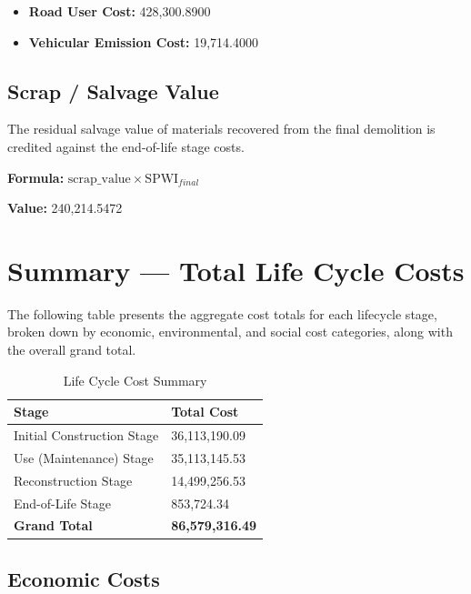 \documentclass[12pt,a4paper]{article}
\begin{document}
\begin{itemize}
  \item \textbf{Road User Cost:} 428,300.8900
  \item \textbf{Vehicular Emission Cost:} 19,714.4000
\end{itemize}

\subsection{Scrap / Salvage Value}

The residual salvage value of materials recovered from the final demolition is credited against the end-of-life stage costs.


\textbf{Formula:} $\text{scrap\_value} \times \text{SPWI}_{final}$


\textbf{Value:} 240,214.5472



\section{Summary --- Total Life Cycle Costs}

The following table presents the aggregate cost totals for each lifecycle stage, broken down by economic, environmental, and social cost categories, along with the overall grand total.


\begin{table}[H]
\centering
\caption{Life Cycle Cost Summary}
\begin{tabular}{L{9cm}R{5cm}}
\toprule
\textbf{Stage} & \textbf{Total Cost} \\
\midrule
  Initial Construction Stage & 36,113,190.09 \\
  Use (Maintenance) Stage & 35,113,145.53 \\
  Reconstruction Stage & 14,499,256.53 \\
  End-of-Life Stage & 853,724.34 \\
\midrule
  \textbf{Grand Total} & \textbf{86,579,316.49} \\
\bottomrule
\end{tabular}
\end{table}


\subsection{Economic Costs}
\end{document}
